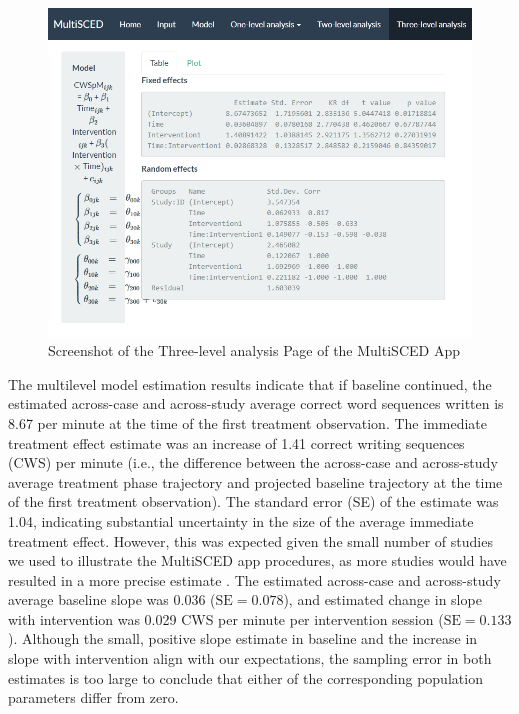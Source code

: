 \documentclass[
]{book}
\begin{document}
\begin{figure}
\includegraphics[width=0.6\linewidth]{images/MultiSCED_3level_Lewandowski2011} \caption{Screenshot of the Three-level analysis Page of the MultiSCED App}\label{fig:MultiSCED-3Level-Lewandowski}
\end{figure}

The multilevel model estimation results indicate that if baseline continued, the estimated across-case and across-study average correct word sequences written is 8.67 per minute at the time of the first treatment observation. The immediate treatment effect estimate was an increase of 1.41 correct writing sequences (CWS) per minute (i.e., the difference between the across-case and across-study average treatment phase trajectory and projected baseline trajectory at the time of the first treatment observation). The standard error (SE) of the estimate was 1.04, indicating substantial uncertainty in the size of the average immediate treatment effect. However, this was expected given the small number of studies we used to illustrate the MultiSCED app procedures, as more studies would have resulted in a more precise estimate \citep[e.g., see][]{datchuk2020Level}. The estimated across-case and across-study average baseline slope was 0.036 (\(\text{SE} = 0.078\)), and estimated change in slope with intervention was 0.029 CWS per minute per intervention session (\(\text{SE} = 0.133\)). Although the small, positive slope estimate in baseline and the increase in slope with intervention align with our expectations, the sampling error in both estimates is too large to conclude that either of the corresponding population parameters differ from zero.
\end{document}
